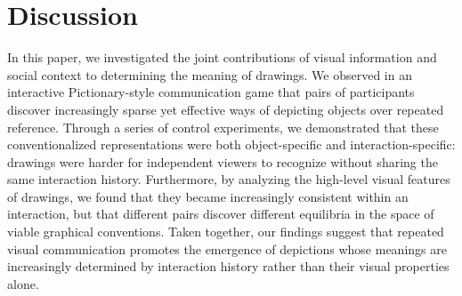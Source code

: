 \documentclass[11pt,letterpaper]{article}
\newcommand{\jefan}[1]{\textcolor{Blue}{jefan: #1}}
\begin{document}






\section{Discussion}

In this paper, we investigated the joint contributions of visual information and social context to determining the meaning of drawings.
We observed in an interactive Pictionary-style communication game that pairs of participants discover increasingly sparse yet effective ways of depicting objects over repeated reference.
Through a series of control experiments, we demonstrated that these conventionalized representations were both object-specific and interaction-specific: drawings were harder for independent viewers to recognize without sharing the same interaction history.
Furthermore, by analyzing the high-level visual features of drawings, we found that they became increasingly consistent within an interaction, but that different pairs discover different equilibria in the space of viable graphical conventions.
Taken together, our findings suggest that repeated visual communication promotes the emergence of depictions whose meanings are increasingly determined by interaction history rather than their visual properties alone.
\end{document}
